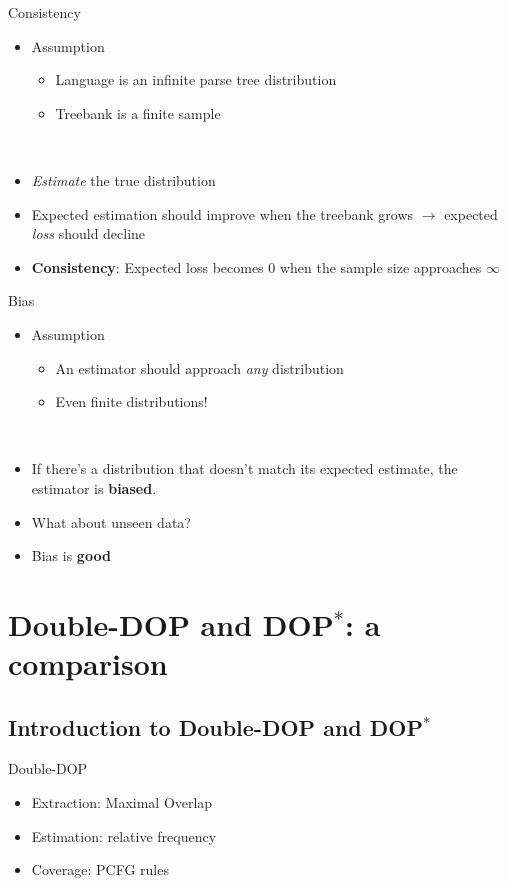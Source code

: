 \documentclass{beamer}
\newcommand{\dops}[0]{DOP$ ^*$}
\newcommand{\ddop}[0]{Double-DOP}
\begin{document}
\begin{frame}{Consistency}

\begin{itemize}
\item Assumption
  \begin{itemize}
  \item Language is an infinite parse tree distribution
  \item Treebank is a finite sample
  \end{itemize}
\\
\item \emph{Estimate} the true distribution
\item Expected estimation should improve when the treebank grows 
$\rightarrow$ expected \emph{loss} should decline
\item {\bf Consistency}: Expected loss becomes 0 when the sample size approaches $\infty$
\end{itemize}

\end{frame}


\begin{frame}{Bias}

\begin{itemize}
\item Assumption
  \begin{itemize}
  \item An estimator should approach \emph{any} distribution
  \item Even finite distributions!
  \end{itemize}
\\
\item If there's a distribution that doesn't match its expected estimate, the estimator is {\bf biased}.
\item What about unseen data?
\item Bias is {\bf good}
\end{itemize}

\end{frame}

\section{\ddop{} and \dops{}: a comparison}

\subsection{Introduction to \ddop{} and \dops{}}
\begin{frame}{\ddop{}}
\begin{itemize}
\item Extraction: Maximal Overlap
\item Estimation: relative frequency 
\item Coverage: PCFG rules
\end{itemize}
\end{frame}
\end{document}
